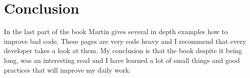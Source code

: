 \section{Conclusion}
In the last part of the book Martin gives several in depth examples how to improve bad code. These pages are very code heavy and I recommend that every developer takes a look at them. My conclusion is that the book despite it being long, was an interesting read and I have learned a lot of small things and good practices that will improve my daily work.
